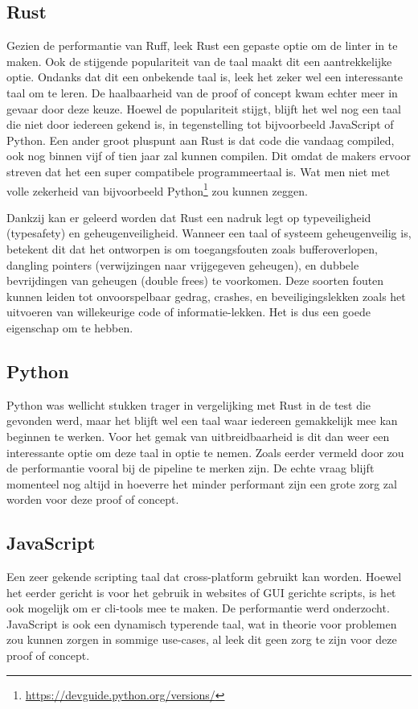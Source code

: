 \subsection{Rust}
Gezien de performantie van Ruff, leek Rust een gepaste optie om de linter in te maken. Ook de stijgende populariteit van de taal maakt dit een aantrekkelijke optie. Ondanks dat dit een onbekende taal is, leek het zeker wel een interessante taal om te leren. De haalbaarheid van de proof of concept kwam echter meer in gevaar door deze keuze. Hoewel de populariteit stijgt, blijft het wel nog een taal die niet door iedereen gekend is, in tegenstelling tot bijvoorbeeld JavaScript of Python. Een ander groot pluspunt aan Rust is dat code die vandaag compiled, ook nog binnen vijf of tien jaar zal kunnen compilen. Dit omdat de makers ervoor streven dat het een super compatibele programmeertaal is. Wat men niet met volle zekerheid van bijvoorbeeld Python\footnote{\url{https://devguide.python.org/versions/}} zou kunnen zeggen. 
 
Dankzij \textcite{Klabnik2022} kan er geleerd worden dat Rust een nadruk legt op typeveiligheid (typesafety) en geheugenveiligheid. Wanneer een taal of systeem geheugenveilig is, betekent dit dat het ontworpen is om toegangsfouten zoals bufferoverlopen, dangling pointers (verwijzingen naar vrijgegeven geheugen), en dubbele bevrijdingen van geheugen (double frees) te voorkomen. Deze soorten fouten kunnen leiden tot onvoorspelbaar gedrag, crashes, en beveiligingslekken zoals het uitvoeren van willekeurige code of informatie-lekken. Het is dus een goede eigenschap om te hebben.

\subsection{Python}
Python was wellicht stukken trager in vergelijking met Rust in de test die gevonden werd, maar het blijft wel een taal waar iedereen gemakkelijk mee kan beginnen te werken. Voor het gemak van uitbreidbaarheid is dit dan weer een interessante optie om deze taal in optie te nemen. Zoals eerder vermeld door \textcite{TurnerTrauring2023} zou de performantie vooral bij de pipeline te merken zijn.
De echte vraag blijft momenteel nog altijd in hoeverre het minder performant zijn een grote zorg zal worden voor deze proof of concept.

\subsection{JavaScript}
Een zeer gekende scripting taal dat cross-platform gebruikt kan worden. Hoewel het eerder gericht is voor het gebruik in websites of GUI gerichte scripts, is het ook mogelijk om er cli-tools mee te maken. De performantie werd onderzocht. JavaScript is ook een dynamisch typerende taal, wat in theorie voor problemen zou kunnen zorgen in sommige use-cases, al leek dit geen zorg te zijn voor deze proof of concept\autocite{Simpson2023}.

